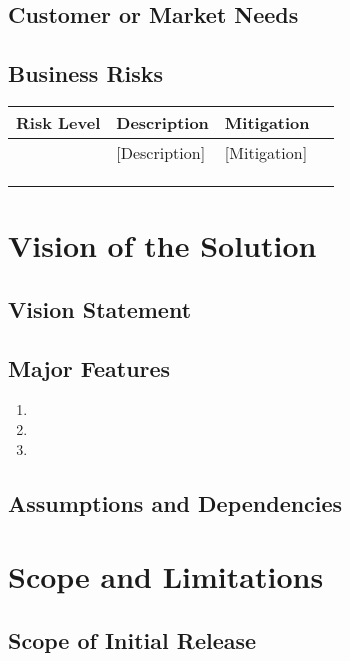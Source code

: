 \documentclass[12pt]{article}
\begin{document}
\subsection{Customer or Market Needs}

\subsection{Business Risks}
\begin{tabular}{|l|l|p{2.5in}|l|}
\hline
\textbf{Risk Level}&\textbf{Description}&\textbf{Mitigation}\\
\hline
[Level]&[Description]&[Mitigation]\\
\hline
&&\\
\hline
&&\\
\hline
&&\\
\hline
\end{tabular}


\section{Vision of the Solution}

\subsection{Vision Statement}

\subsection{Major Features}
\begin{enumerate}
\item 
\item
\item
\end{enumerate}

\subsection{Assumptions and Dependencies}
 

\section{Scope and Limitations}

\subsection{Scope of Initial Release}
\end{document}
